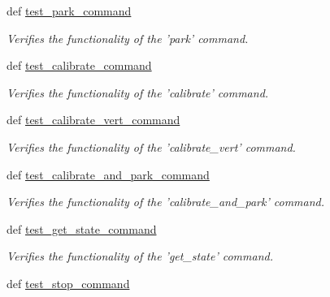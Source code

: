 \begin{DoxyCompactItemize}
def \hyperlink{classhwm_1_1hardware_1_1devices_1_1drivers_1_1mxl__antenna__controller_1_1tests_1_1test__mxl__anf1b82778ca0869b41ace53be3d0454a2_a320e1674154b6d9e69ce4a7e9623f79c}{test\-\_\-park\-\_\-command}
\begin{DoxyCompactList}\small\item\em Verifies the functionality of the 'park' command. \end{DoxyCompactList}\item 
def \hyperlink{classhwm_1_1hardware_1_1devices_1_1drivers_1_1mxl__antenna__controller_1_1tests_1_1test__mxl__anf1b82778ca0869b41ace53be3d0454a2_a1b1cc000e55d25e248c14775e86506f0}{test\-\_\-calibrate\-\_\-command}
\begin{DoxyCompactList}\small\item\em Verifies the functionality of the 'calibrate' command. \end{DoxyCompactList}\item 
def \hyperlink{classhwm_1_1hardware_1_1devices_1_1drivers_1_1mxl__antenna__controller_1_1tests_1_1test__mxl__anf1b82778ca0869b41ace53be3d0454a2_aad2466a6bbd90f1f34a2ba714c03c8aa}{test\-\_\-calibrate\-\_\-vert\-\_\-command}
\begin{DoxyCompactList}\small\item\em Verifies the functionality of the 'calibrate\-\_\-vert' command. \end{DoxyCompactList}\item 
def \hyperlink{classhwm_1_1hardware_1_1devices_1_1drivers_1_1mxl__antenna__controller_1_1tests_1_1test__mxl__anf1b82778ca0869b41ace53be3d0454a2_aaf95ab1b66d16420b47bc05e13a0dd02}{test\-\_\-calibrate\-\_\-and\-\_\-park\-\_\-command}
\begin{DoxyCompactList}\small\item\em Verifies the functionality of the 'calibrate\-\_\-and\-\_\-park' command. \end{DoxyCompactList}\item 
def \hyperlink{classhwm_1_1hardware_1_1devices_1_1drivers_1_1mxl__antenna__controller_1_1tests_1_1test__mxl__anf1b82778ca0869b41ace53be3d0454a2_a174d9791d359dd1072343bfb1a619b55}{test\-\_\-get\-\_\-state\-\_\-command}
\begin{DoxyCompactList}\small\item\em Verifies the functionality of the 'get\-\_\-state' command. \end{DoxyCompactList}\item 
def \hyperlink{classhwm_1_1hardware_1_1devices_1_1drivers_1_1mxl__antenna__controller_1_1tests_1_1test__mxl__anf1b82778ca0869b41ace53be3d0454a2_adad0f1be9e0129fa7cdb5b48af3e92e8}{test\-\_\-stop\-\_\-command}

\end{DoxyCompactItemize}
